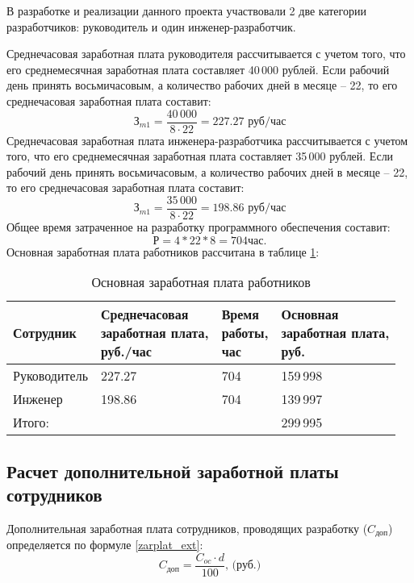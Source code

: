 В разработке и реализации данного проекта участвовали 2 две категории разработчиков: руководитель и один инженер-разработчик.

Среднечасовая заработная плата руководителя рассчитывается с учетом того, что его среднемесячная заработная плата составляет 40\,000 рублей. Если рабочий день принять восьмичасовым, а количество рабочих дней в месяце – 22, то его среднечасовая заработная плата составит:
$$
	\textit{З}_{m1} = \frac{40\,000}{8 \cdot 22} = 227.27 \mbox{ руб/час}
$$
Среднечасовая заработная плата инженера-разработчика рассчитывается с учетом того, что его среднемесячная заработная плата составляет 35\,000 рублей. Если рабочий день принять восьмичасовым, а количество рабочих дней в месяце – 22, то его среднечасовая заработная плата составит:
$$
	\textit{З}_{m1} = \frac{35\,000}{8 \cdot 22} = 198.86 \mbox{ руб/час}
$$
Общее время затраченное на разработку программного обеспечения составит:
$$
	Р = 4*22*8 = 704 час.
$$
Основная заработная плата работников рассчитана в таблице \ref{zp_table}:

\begin{table}[h]
	\caption{Основная заработная плата работников}
	\label{zp_table}
	\begin{tabular}{|l|l|l|l|}
		\hline
			Сотрудник & \thead{Среднечасовая\\ заработная плата,\\руб./час} & \thead{Время\\работы,\\час} & \thead{Основная\\заработная плата,\\руб.}\\
		\hline
			Руководитель & 227.27 & 704 & 159\,998 \\
		\hline
			Инженер & 198.86 & 704 & 139\,997 \\
		\hline			
			Итого: & & & 299\,995 \\
		\hline					
	\end{tabular}
\end{table}

\subsection{Расчет дополнительной заработной платы сотрудников}
Дополнительная заработная плата сотрудников, проводящих разработку ($C_\textit{доп}$) определяется по формуле \ref{zarplat_ext}:
\begin{equation}
	C_\textit{доп} = \frac{C_{oc} \cdot d}{100} \mbox{, (руб.)}
	\label{zarplat_ext}
\end{equation}  

